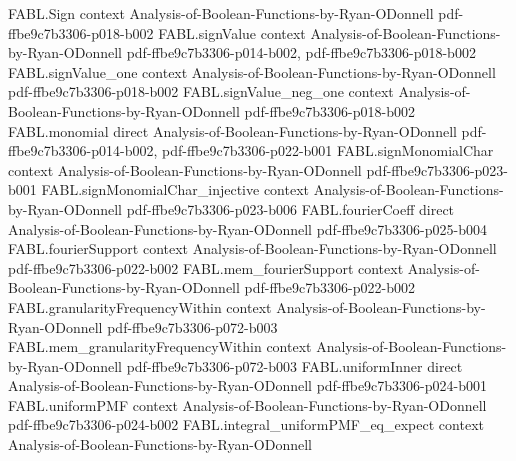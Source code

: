\begin{theorem}
\label{FABL.FiniteFourierBasis.covariance_eq_sum_fourierCoeff_mul}
\leanok
{}
\proofstep
  {FABL.Sign}
  {context}
  {Analysis-of-Boolean-Functions-by-Ryan-ODonnell}
  {pdf-ffbe9c7b3306-p018-b002}
\proofstep
  {FABL.signValue}
  {context}
  {Analysis-of-Boolean-Functions-by-Ryan-ODonnell}
  {pdf-ffbe9c7b3306-p014-b002,
    pdf-ffbe9c7b3306-p018-b002}
\proofstep
  {FABL.signValue_one}
  {context}
  {Analysis-of-Boolean-Functions-by-Ryan-ODonnell}
  {pdf-ffbe9c7b3306-p018-b002}
\proofstep
  {FABL.signValue_neg_one}
  {context}
  {Analysis-of-Boolean-Functions-by-Ryan-ODonnell}
  {pdf-ffbe9c7b3306-p018-b002}
\proofstep
  {FABL.monomial}
  {direct}
  {Analysis-of-Boolean-Functions-by-Ryan-ODonnell}
  {pdf-ffbe9c7b3306-p014-b002,
    pdf-ffbe9c7b3306-p022-b001}
\proofstep
  {FABL.signMonomialChar}
  {context}
  {Analysis-of-Boolean-Functions-by-Ryan-ODonnell}
  {pdf-ffbe9c7b3306-p023-b001}
\proofstep
  {FABL.signMonomialChar_injective}
  {context}
  {Analysis-of-Boolean-Functions-by-Ryan-ODonnell}
  {pdf-ffbe9c7b3306-p023-b006}
\proofstep
  {FABL.fourierCoeff}
  {direct}
  {Analysis-of-Boolean-Functions-by-Ryan-ODonnell}
  {pdf-ffbe9c7b3306-p025-b004}
\proofstep
  {FABL.fourierSupport}
  {context}
  {Analysis-of-Boolean-Functions-by-Ryan-ODonnell}
  {pdf-ffbe9c7b3306-p022-b002}
\proofstep
  {FABL.mem_fourierSupport}
  {context}
  {Analysis-of-Boolean-Functions-by-Ryan-ODonnell}
  {pdf-ffbe9c7b3306-p022-b002}
\proofstep
  {FABL.granularityFrequencyWithin}
  {context}
  {Analysis-of-Boolean-Functions-by-Ryan-ODonnell}
  {pdf-ffbe9c7b3306-p072-b003}
\proofstep
  {FABL.mem_granularityFrequencyWithin}
  {context}
  {Analysis-of-Boolean-Functions-by-Ryan-ODonnell}
  {pdf-ffbe9c7b3306-p072-b003}
\proofstep
  {FABL.uniformInner}
  {direct}
  {Analysis-of-Boolean-Functions-by-Ryan-ODonnell}
  {pdf-ffbe9c7b3306-p024-b001}
\proofstep
  {FABL.uniformPMF}
  {context}
  {Analysis-of-Boolean-Functions-by-Ryan-ODonnell}
  {pdf-ffbe9c7b3306-p024-b002}
\proofstep
  {FABL.integral_uniformPMF_eq_expect}
  {context}
  {Analysis-of-Boolean-Functions-by-Ryan-ODonnell}

\end{theorem}
